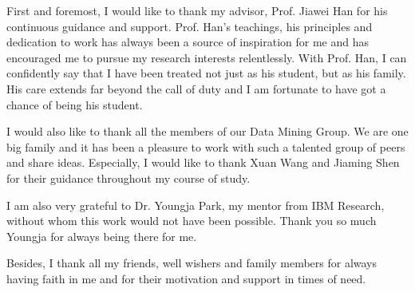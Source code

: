 First and foremost, I would like to thank my advisor, Prof. Jiawei Han for his continuous guidance and support. Prof. Han's teachings, his principles and dedication to work has always been a source of inspiration for me and has encouraged me to pursue my research interests relentlessly. With Prof. Han, I can confidently say that I have been treated not just as his student, but as his family. His care extends far beyond the call of duty and I am fortunate to have got a chance of being his student.

I would also like to thank all the members of our Data Mining Group. We are one big family and it has been a pleasure to work with such a talented group of peers and share ideas. Especially, I would like to thank Xuan Wang and Jiaming Shen for their guidance throughout my course of study.

I am also very grateful to Dr. Youngja Park, my mentor from IBM Research, without whom this work would not have been possible. Thank you so much Youngja for always being there for me.

Besides, I thank all my friends, well wishers and family members for always having faith in me and for their motivation and support in times of need.